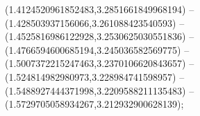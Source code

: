 \documentclass[
    11pt,
    a4paper,
    oneside,
    headinlcude, footinclude,
    twoside,
]{report}
\renewcommand{\vec}[1]{\overrightarrow{#1}}
\begin{document}
(1.4124520961852483,3.2851661849968194) -- (1.428503937156066,3.261088423540593) -- (1.4525816986122928,3.2530625030551836) -- (1.4766594600685194,3.245036582569775) -- (1.5007372215247463,3.2370106620843657) -- (1.524814982980973,3.228984741598957) -- (1.5488927444371998,3.2209588211135483) -- (1.5729705058934267,3.212932900628139);




\end{document}
